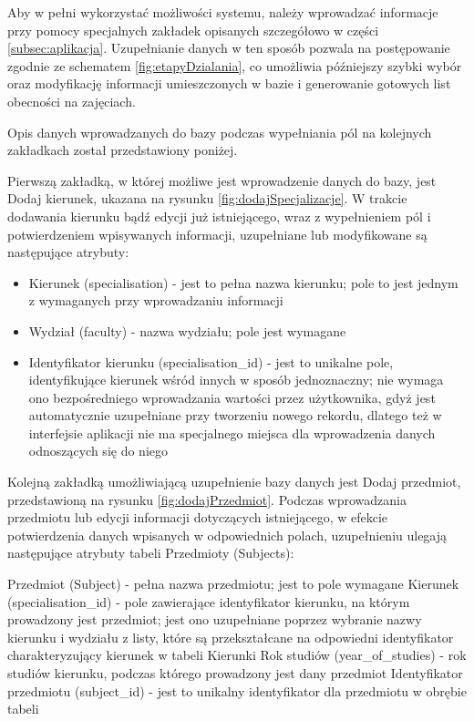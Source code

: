 Aby w pełni wykorzystać możliwości systemu, należy wprowadzać informacje przy pomocy specjalnych zakładek opisanych szczegółowo w części \ref{subsec:aplikacja}. Uzupełnianie danych w ten sposób pozwala na postępowanie zgodnie ze schematem \ref{fig:etapyDzialania}, co umożliwia późniejszy szybki wybór oraz modyfikację informacji umieszczonych w bazie i generowanie gotowych list obecności na zajęciach.

Opis danych wprowadzanych do bazy podczas wypełniania pól na kolejnych zakładkach został przedstawiony poniżej.

Pierwszą zakładką, w której możliwe jest wprowadzenie danych do bazy, jest Dodaj kierunek, ukazana na rysunku \ref{fig:dodajSpecjalizacje}. W trakcie dodawania kierunku bądź edycji już istniejącego, wraz z wypełnieniem pól i potwierdzeniem wpisywanych informacji, uzupełniane lub modyfikowane są następujące atrybuty:

\begin{itemize}

\item Kierunek (specialisation) - jest to pełna nazwa kierunku; pole to jest jednym z wymaganych przy wprowadzaniu informacji 
\item Wydział (faculty) - nazwa wydziału; pole jest wymagane
\item Identyfikator kierunku (specialisation\_id) - jest to unikalne pole, identyfikujące kierunek wśród innych w sposób jednoznaczny; nie wymaga ono bezpośredniego wprowadzania wartości przez użytkownika, gdyż jest automatycznie uzupełniane przy tworzeniu nowego rekordu, dlatego też w interfejsie aplikacji nie ma specjalnego miejsca dla wprowadzenia danych odnoszących się do niego
\end{itemize}
Kolejną zakładką umożliwiającą uzupełnienie bazy danych jest Dodaj przedmiot, przedstawioną na rysunku \ref{fig:dodajPrzedmiot}. Podczas wprowadzania przedmiotu lub edycji informacji dotyczących istniejącego, w efekcie potwierdzenia danych wpisanych w odpowiednich polach, uzupełnieniu ulegają następujące atrybuty tabeli Przedmioty (Subjects):

Przedmiot (Subject) - pełna nazwa przedmiotu; jest to pole wymagane
Kierunek (specialisation\_id) - pole zawierające identyfikator kierunku, na którym prowadzony jest przedmiot; jest ono uzupełniane poprzez wybranie nazwy kierunku i wydziału z listy, które są przekształcane na odpowiedni identyfikator charakteryzujący kierunek w tabeli Kierunki
Rok studiów (year\_of\_studies) - rok studiów kierunku, podczas którego prowadzony jest dany przedmiot
Identyfikator przedmiotu (subject\_id) - jest to unikalny identyfikator dla przedmiotu w obrębie tabeli

